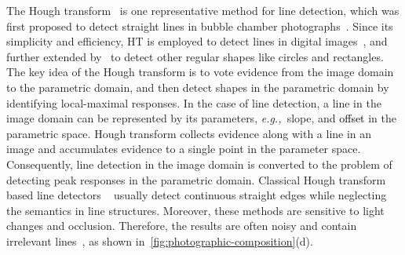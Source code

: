 \documentclass[10pt,journal,cspaper,compsoc]{IEEEtran}
\newcommand{\revise}[1]{{\textcolor{black}{#1}}}
\newcommand{\CheckRmv}[1]{}
\newcommand{\CheckRmv}[1]{#1}
\def\eg{\emph{e.g.,~}}
\begin{document}
%
The Hough transform~\cite{duda1971use,ballard1981generating} is one 
representative method for line detection,
which was first proposed to detect straight lines in bubble chamber 
photographs~\cite{hough1962method}.
Since its simplicity and efficiency, 
HT is employed to detect lines in digital images~\cite{duda1971use},
and further extended by~\cite{ballard1981generating} to detect other regular shapes like circles and rectangles.
%
The key idea of the Hough transform is to vote evidence from the image domain to the parametric domain, and
then detect shapes in the parametric domain by identifying local-maximal responses.
%
In the case of line detection, a line in the image domain can be represented 
by its parameters, \eg slope, and \revise{offset} in the parametric space.
%
Hough transform collects evidence along with a line in an image
and accumulates evidence to a single point in the parameter space.
%
Consequently, line detection in the image domain is converted to the problem of detecting peak responses in the
parametric domain.
%
Classical Hough transform based line detectors
~\cite{fernandes2008real,yacoub1995hierarchical,princen1990hierarchical,kiryati1991probabilistic}
usually detect continuous straight edges while neglecting the semantics in line structures.
%
Moreover, these methods are sensitive to light changes and occlusion.
%
Therefore, the results are often noisy and contain irrelevant lines~\cite{akinlar2011edlines},
as shown in~\cref{fig:photographic-composition}(d).

\newcommand{\addImg}[1]{\subfigure[]{\texttt{[image: figures/\#1]}}}
\CheckRmv{
\begin{figure*}[t]
  \centering
  \hfill
  \addImg{composition_1.pdf}
  \addImg{composition_2.pdf}
  \addImg{composition_3.pdf}
  \addImg{composition_4.pdf}
  \hfill
  \caption{
    Example pictures from~\cite{liu2010optimizing} reveal that semantic lines
    may help in the photographic composition.
    (a): a photo was taken with an arbitrary pose.
    (b): a photo fits the golden ratio principle~\cite{caplin2008art,krages2012photography} which \revise{is} obtained by the method described
    in\cite{liu2010optimizing} using so-called `prominent lines' 
    in the image.
    (c): Our detection results \revise{are} clean and comprise only a few meaningful
        lines that are potentially helpful in the photographic composition.
    (d): Line detection results by the classical line detection algorithms 
    often focus on fine detailed straight edges.
  }
  \label{fig:photographic-composition}
\end{figure*}
}
\end{document}
